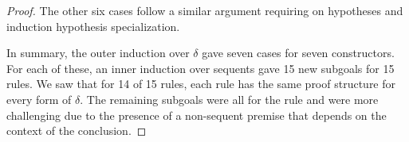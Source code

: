 \begin{proof}
The other six \rlnmsinit{} cases follow a similar argument requiring  on hypotheses and induction hypothesis specialization.

In summary, the outer induction over $\delta$ gave seven cases for seven  constructors. For each of these, an inner induction over sequents gave 15 new subgoals for 15 rules. We saw that for 14 of 15 rules, each rule has the same proof structure for every form of $\delta$. The remaining subgoals were all for the rule \rlnmsinit{} and were more challenging due to the presence of a non-sequent premise that depends on the context of the conclusion.

\end{proof}